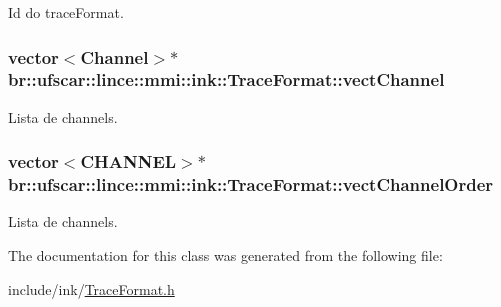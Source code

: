 Id do traceFormat. 

\hypertarget{classbr_1_1ufscar_1_1lince_1_1mmi_1_1ink_1_1TraceFormat_a7a441396c4a7f0d3a0d05bff74495f37}{
\subsubsection[{vectChannel}]{\setlength{\rightskip}{0pt plus 5cm}vector$<$Channel$>$$\ast$ {\bf br::ufscar::lince::mmi::ink::TraceFormat::vectChannel}}}
\label{classbr_1_1ufscar_1_1lince_1_1mmi_1_1ink_1_1TraceFormat_a7a441396c4a7f0d3a0d05bff74495f37}


Lista de channels. 

\hypertarget{classbr_1_1ufscar_1_1lince_1_1mmi_1_1ink_1_1TraceFormat_ab69e1f7711dde259cb5ef481d025f556}{
\subsubsection[{vectChannelOrder}]{\setlength{\rightskip}{0pt plus 5cm}vector$<${\bf CHANNEL}$>$$\ast$ {\bf br::ufscar::lince::mmi::ink::TraceFormat::vectChannelOrder}}}
\label{classbr_1_1ufscar_1_1lince_1_1mmi_1_1ink_1_1TraceFormat_ab69e1f7711dde259cb5ef481d025f556}


Lista de channels. 



The documentation for this class was generated from the following file:\begin{DoxyCompactItemize}
\item 
include/ink/\hyperlink{TraceFormat_8h}{TraceFormat.h}\end{DoxyCompactItemize}
